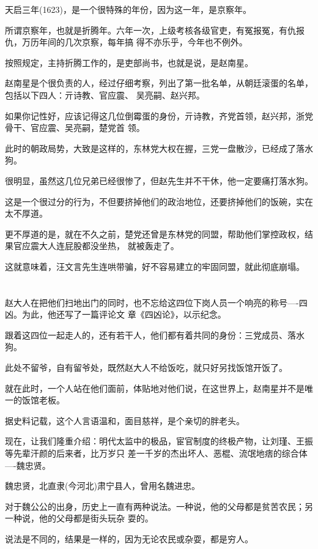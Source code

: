 \documentclass[11pt,a4paper,onecolumn]{article}
\begin{document}
天启三年(1623)，是一个很特殊的年份，因为这一年，是京察年。

所谓京察年，也就是折腾年。六年一次，上级考核各级官吏，有冤报冤，有仇报仇，万历年间的几次京察，每年搞
得不亦乐乎，今年也不例外。

按照规定，主持折腾工作的，是吏部尚书，也就是说，是赵南星。

赵南星是个很负责的人，经过仔细考察，列出了第一批名单，从朝廷滚蛋的名单，包括以下四人：亓诗教、官应震、
吴亮嗣、赵兴邦。

如果你记性好，应该记得这几位倒霉蛋的身份，亓诗教，齐党首领，赵兴邦，浙党骨干、官应震、吴亮嗣，楚党首
领。

此时的朝政局势，大致是这样的，东林党大权在握，三党一盘散沙，已经成了落水狗。

很明显，虽然这几位兄弟已经很惨了，但赵先生并不干休，他一定要痛打落水狗。

这是一个很过分的行为，不但要挤掉他们的政治地位，还要挤掉他们的饭碗，实在太不厚道。

更不厚道的是，就在不久之前，楚党还曾是东林党的同盟，帮助他们掌控政权，结果官应震大人连屁股都没坐热，
就被轰走了。

这就意味着，汪文言先生连哄带骗，好不容易建立的牢固同盟，就此彻底崩塌。

\section[\thesection]{}

赵大人在把他们扫地出门的同时，也不忘给这四位下岗人员一个响亮的称号----四凶。为此，他还写了一篇评论文
章《四凶论》，以示纪念。

跟着这四位一起走人的，还有若干人，他们都有着共同的身份：三党成员、落水狗。

此处不留爷，自有留爷处，既然赵大人不给饭吃，就只好另找饭馆开饭了。

就在此时，一个人站在他们面前，体贴地对他们说，在这世界上，赵南星并不是唯一的饭馆老板。

据史料记载，这个人言语温和，面目慈祥，是个亲切的胖老头。

现在，让我们隆重介绍：明代太监中的极品，宦官制度的终极产物，让刘瑾、王振等先辈汗颜的后来者，比万岁只
差一千岁的杰出坏人、恶棍、流氓地痞的综合体----魏忠贤。

魏忠贤，北直隶(今河北)肃宁县人，曾用名魏进忠。

对于魏公公的出身，历史上一直有两种说法。一种说，他的父母都是贫苦农民；另一种说，他的父母都是街头玩杂
耍的。

说法是不同的，结果是一样的，因为无论农民或杂耍，都是穷人。
\end{document}

